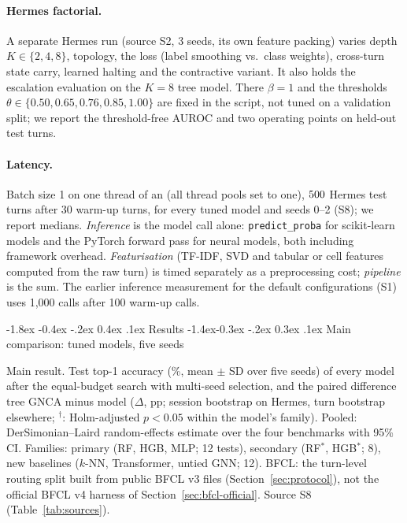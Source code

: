 \documentclass[10pt,twocolumn,letterpaper]{article}
\makeatletter
\renewcommand\section{\@startsection {section}{1}{\z@}%
  {-1.8ex \@plus -0.4ex \@minus -.2ex}%
  {0.4ex \@plus.1ex}%
  {\normalfont\normalsize\bfseries}}
\renewcommand\subsection{\@startsection{subsection}{2}{\z@}%
  {-1.4ex\@plus -0.3ex \@minus -.2ex}%
  {0.3ex \@plus .1ex}%
  {\normalfont\normalsize\bfseries}}
\makeatother
\begin{document}
\paragraph{Hermes factorial.} A separate Hermes run (source S2, 3 seeds, its own feature packing) varies depth $K\in\{2,4,8\}$, topology, the loss (label smoothing vs.\ class weights), cross-turn state carry, learned halting and the contractive variant. It also holds the escalation evaluation on the $K{=}8$ tree model. There $\beta{=}1$ and the thresholds $\theta\in\{0.50,0.65,0.76,0.85,1.00\}$ are fixed in the script, not tuned on a validation split; we report the threshold-free AUROC and two operating points on held-out test turns.
\paragraph{Latency.} Batch size 1 on one thread of an \numCpuName{} (all thread pools set to one), $500$ Hermes test turns after 30 warm-up turns, for every tuned model and seeds 0--2 (S8); we report medians. \emph{Inference} is the model call alone: \texttt{predict\_\allowbreak{}proba} for scikit-learn models and the PyTorch forward pass for neural models, both including framework overhead. \emph{Featurisation} (TF-IDF, SVD and tabular or cell features computed from the raw turn) is timed separately as a preprocessing cost; \emph{pipeline} is the sum. The earlier inference measurement for the default configurations (S1) uses 1{,}000 calls after 100 warm-up calls.

\section{Results}\label{sec:results}
\subsection{Main comparison: tuned models, five seeds}\label{sec:main-comparison}
\begin{table}[t]
\centering
\scriptsize
\setlength{\tabcolsep}{3pt}
\caption{Main result. Test top-1 accuracy (\%, mean $\pm$ SD over five seeds) of every model after the equal-budget search with multi-seed selection, and the paired difference tree GNCA minus model ($\Delta$, pp; session bootstrap on Hermes, turn bootstrap elsewhere; $^{\dagger}$: Holm-adjusted $p<0.05$ within the model's family). Pooled: DerSimonian--Laird random-effects estimate over the four benchmarks with 95\% CI. Families: primary (RF, HGB, MLP; 12 tests), secondary (RF$^\ast$, HGB$^\ast$; 8), new baselines ($k$-NN, Transformer, untied GNN; 12). BFCL: the turn-level routing split built from public BFCL v3 files (Section~\ref{sec:protocol}), not the official BFCL v4 harness of Section~\ref{sec:bfcl-official}. Source S8 (Table~\ref{tab:sources}).}
\label{tab:rig-main}

\end{table}
\end{document}
